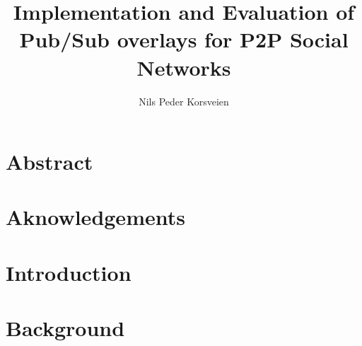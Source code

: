 \documentclass[UKenglish, a4paper]{ifimaster}
\title{Implementation and Evaluation of Pub/Sub overlays for P2P Social Networks}
\subtitle{}
\author{Nils Peder Korsveien}
\begin{document}
\ififorside{}
\frontmatter{}
\maketitle{}

\chapter*{Abstract}
\tableofcontents{}
\listoffigures{}
\listoftables{}
\chapter*{Aknowledgements}
\mainmatter{}

\chapter{Introduction}


\chapter{Background}
\label{ch:background}

\end{document}
